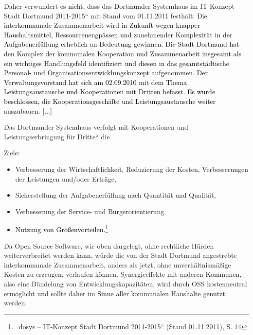 \documentclass[a4paper]{article}
\newcommand\liststyleWWviiiNumi{%
\renewcommand\theenumi{\arabic{enumi}}
\renewcommand\theenumii{\arabic{enumii}}
\renewcommand\theenumiii{\arabic{enumiii}}
\renewcommand\labelitemi{{}-}
\renewcommand\labelenumi{\theenumi.}
\renewcommand\labelenumii{\theenumii.}
\renewcommand\labelenumiii{\theenumiii.}
}
\begin{document}
{
Daher verwundert es nicht, dass das Dortmunder Systemhaus im
{\quotedblbase}IT-Konzept Stadt Dortmund 2011-2015{\textquotedblleft}
mit Stand vom 01.11.2011 festh\"alt:
{\guillemotright}\textcolor{black}{Die interkommunale Zusammenarbeit
wird in Zukunft wegen knapper Haushaltsmittel, Ressourcenengp\"assen
und zunehmender Komplexit\"at in der Aufgabenerf\"ullung erheblich an
Bedeutung gewinnen. Die Stadt Dortmund hat den Komplex der kommunalen
Kooperation und Zusammenarbeit insgesamt als ein wichtiges
Handlungsfeld identifiziert und diesen in das gesamtst\"adtische
Personal- und Organisationsentwicklungskonzept aufgenommen. Der
Verwaltungsvorstand hat sich am 02.09.2010 mit dem Thema
{\quotedblbase}Leistungsaustausche und Kooperationen mit Dritten
befasst. Es wurde beschlossen, die Kooperationsgesch\"afte und
Leistungsaustausche weiter auszubauen. }[...]}


\bigskip

{\color{black}
Das Dortmunder Systemhaus verfolgt mit {\quotedblbase}Kooperationen und
Leistungserbringung f\"ur Dritte{\textquotedblleft} die}

{\color{black}
Ziele:}

\liststyleWWviiiNumi
\begin{itemize}
\item {
Verbesserung der Wirtschaftlichkeit, Reduzierung der Kosten,
Verbesserungen der Leistungen und/oder Ertr\"age,}
\item {\color{black}
Sicherstellung der Aufgabenerf\"ullung nach Quantit\"at und Qualit\"at,}
\item {\color{black}
Verbesserung der Service- und B\"urgerorientierung,}
\item {
\textcolor{black}{Nutzung von
Gr\"o{\ss}envorteilen.{\guillemotleft}}\footnote{\ dosys --
{\quotedblbase}IT-Konzept Stadt Dortmund 2011-2015{\textquotedblleft}
(Stand 01.11.2011), S. 14}}
\end{itemize}

\bigskip

{
Da Open Source Software, wie oben dargelegt, ohne rechtliche H\"urden
weiterverbreitet werden kann, w\"urde die von der Stadt Dortmund
angestrebte interkommunale Zusammenarbeit, anders als jetzt, ohne
unverh\"altnism\"a{\ss}ige Kosten zu erzeugen, verlaufen k\"onnen.
Synergieeffekte mit anderen Kommunen, also eine B\"undelung von
Entwicklungskapazit\"aten, wird durch OSS kostenneutral erm\"oglicht
und sollte daher im Sinne aller kommunalen Haushalte genutzt werden.}
\end{document}
